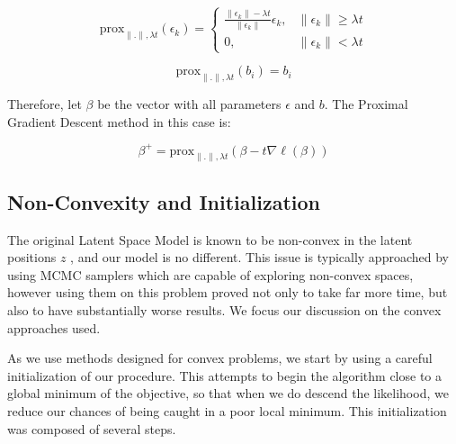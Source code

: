 \documentclass{article}
\begin{document}

\[
\text{prox}_{\|.\|, \lambda t}(\epsilon_{k}) = 
\begin{cases}
\frac{\|\epsilon_{k}\| - \lambda t}{\|\epsilon_{k}\|}\epsilon_{k}, & \|\epsilon_{k}\| \ge \lambda t \\
0, & \|\epsilon_{k}\| < \lambda t
\end{cases}
\]

\[
\text{prox}_{\|.\|, \lambda t}(b_i) = b_i
\]

Therefore, let $\beta$ be the vector with all parameters $\epsilon$ and $b$. The Proximal Gradient Descent method in this case is:

\[
\beta^{+} = \text{prox}_{\|.\|, \lambda t}(\beta - t \nabla \ell(\beta))
\]

%
%
%
%
%


\subsection{Non-Convexity and Initialization}

The original Latent Space Model is known to be non-convex in the latent positions $z$ \cite{Hoff2002}, and our model is no different. This issue is typically approached by using MCMC samplers \cite{Hoff2002, salter-townshend2017} which are capable of exploring non-convex spaces, however using them on this problem proved not only to take far more time, but also to have substantially worse results. We focus our discussion on the convex approaches used.

As we use methods designed for convex problems, we start by using a careful initialization of our procedure. This attempts to begin the algorithm close to a global minimum of the objective, so that when we do descend the likelihood, we reduce our chances of being caught in a poor local minimum. This initialization was composed of several steps.
\end{document}
